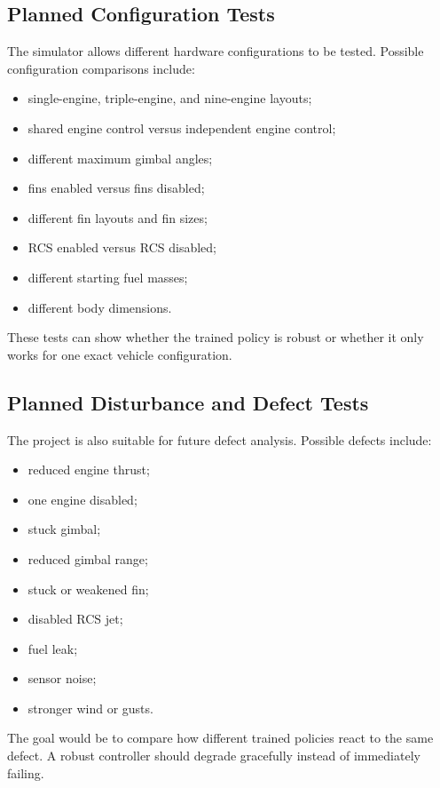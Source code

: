 \documentclass{article}
\begin{document}
\subsection{Planned Configuration Tests}

The simulator allows different hardware configurations to be tested. Possible configuration comparisons include:

\begin{itemize}
    \item single-engine, triple-engine, and nine-engine layouts;
    \item shared engine control versus independent engine control;
    \item different maximum gimbal angles;
    \item fins enabled versus fins disabled;
    \item different fin layouts and fin sizes;
    \item RCS enabled versus RCS disabled;
    \item different starting fuel masses;
    \item different body dimensions.
\end{itemize}

These tests can show whether the trained policy is robust or whether it only works for one exact vehicle configuration.

\subsection{Planned Disturbance and Defect Tests}

The project is also suitable for future defect analysis. Possible defects include:

\begin{itemize}
    \item reduced engine thrust;
    \item one engine disabled;
    \item stuck gimbal;
    \item reduced gimbal range;
    \item stuck or weakened fin;
    \item disabled RCS jet;
    \item fuel leak;
    \item sensor noise;
    \item stronger wind or gusts.
\end{itemize}

The goal would be to compare how different trained policies react to the same defect. A robust controller should degrade gracefully instead of immediately failing.
\end{document}
